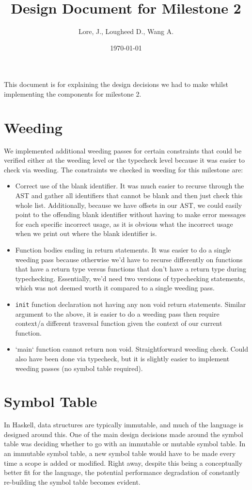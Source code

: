\documentclass[11pt]{article}
\author{Lore, J., Lougheed D., Wang A.}
\date{\today}
\title{Design Document for Milestone 2}
\begin{document}
\maketitle
\tableofcontents

This document is for explaining the design decisions we had to make
whilst implementing the components for milestone 2.  \newpage
\section{Weeding}
\label{sec:org1bf1bbc}
We implemented additional weeding passes for certain constraints
that could be verified either at the weeding level or the typecheck
level because it was easier to check via weeding. The constraints we
checked in weeding for this milestone are:
\begin{itemize}
\item Correct use of the blank identifier. It was much easier to recurse
through the AST and gather all identifiers that cannot be blank
and then just check this whole list. Additionally, because we have
offsets in our AST, we could easily point to the offending blank
identifier without having to make error messages for each specific
incorrect usage, as it is obvious what the incorrect usage when we
print out where the blank identifier is.
\item Function bodies ending in return statements. It was easier to do
a single weeding pass because otherwise we'd have to recurse
differently on functions that have a return type versus functions
that don't have a return type during typechecking. Essentially,
we'd need two versions of typechecking statements, which was not
deemed worth it compared to a single weeding pass.
\item \texttt{init} function declaration not having any non void return
statements. Similar argument to the above, it is easier to do a
weeding pass then require context/a different traversal function
given the context of our current function.
\item `main` function cannot return non void. Straightforward weeding
check. Could also have been done via typecheck, but it is slightly
easier to implement weeding passes (no symbol table required).
\end{itemize}
\section{Symbol Table}
\label{sec:orge36abfc}
In Haskell, data structures are typically immutable, and much of the
language is designed around this. One of the main design decisions
made around the symbol table was deciding whether to go with an
immutable or mutable symbol table. In an immutable symbol table, a
new symbol table would have to be made every time a scope is added
or modified. Right away, despite this being a conceptually better
fit for the language, the potential performance degradation of
constantly re-building the symbol table becomes evident.
\end{document}
